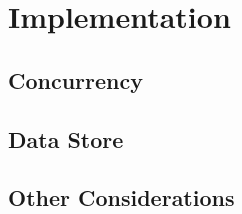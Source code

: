\chapter{Implementation}

\section{Concurrency}

\section{Data Store}

\section{Other Considerations}





